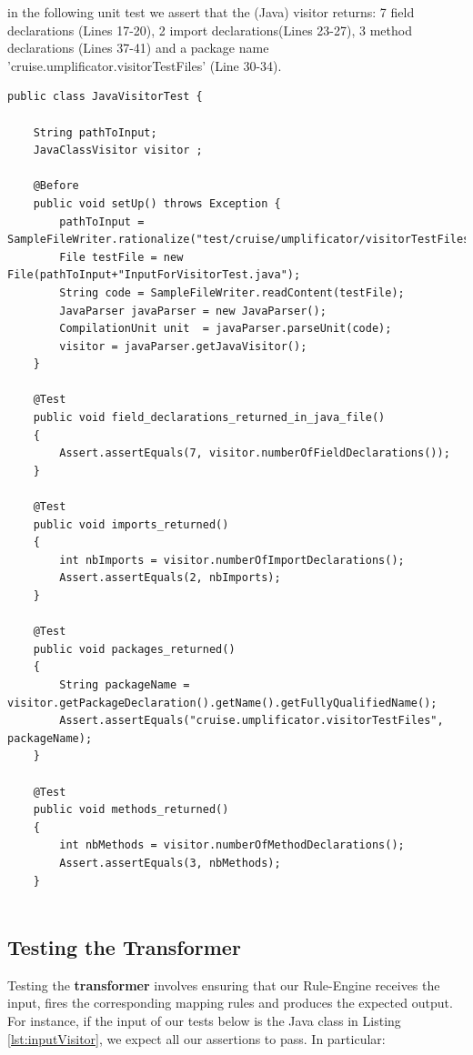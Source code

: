 in the following unit test we assert that the (Java) visitor returns: 7 field declarations (Lines 17-20), 2 import declarations(Lines 23-27), 3 method declarations (Lines 37-41) and a package name 'cruise.umplificator.visitorTestFiles' (Line 30-34).


\begin{lstlisting}[style=java]
public class JavaVisitorTest {

	String pathToInput;
	JavaClassVisitor visitor ;
	
	@Before
	public void setUp() throws Exception {
		pathToInput = SampleFileWriter.rationalize("test/cruise/umplificator/visitorTestFiles/");
		File testFile = new File(pathToInput+"InputForVisitorTest.java");
		String code = SampleFileWriter.readContent(testFile);
		JavaParser javaParser = new JavaParser();
		CompilationUnit unit  = javaParser.parseUnit(code);
		visitor = javaParser.getJavaVisitor();
	}
	
	@Test
	public void field_declarations_returned_in_java_file()
	{
		Assert.assertEquals(7, visitor.numberOfFieldDeclarations());
	}
		
	@Test
	public void imports_returned()
	{
		int nbImports = visitor.numberOfImportDeclarations();
		Assert.assertEquals(2, nbImports);
	}
	
	@Test
	public void packages_returned()
	{
	    String packageName = visitor.getPackageDeclaration().getName().getFullyQualifiedName();
		Assert.assertEquals("cruise.umplificator.visitorTestFiles", packageName);
	}

	@Test
	public void methods_returned()
	{
		int nbMethods = visitor.numberOfMethodDeclarations();
		Assert.assertEquals(3, nbMethods);
	}
	
\end{lstlisting}

\subsection{Testing the Transformer}

Testing the \textbf{transformer} involves ensuring that our Rule-Engine receives the input, fires the corresponding mapping rules and produces the expected output.
For instance, if the input of our tests below is the Java class in Listing \ref{lst:inputVisitor}, we expect all our assertions to pass. In particular:


